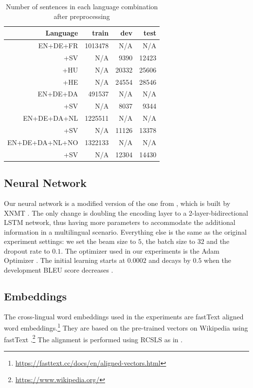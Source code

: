 \documentclass[thesis]{cluu}
\begin{document}
\begin{table}
  \centering
  \begin{tabular}{r|rrr}
    \hline
    \textbf{Language} & \textbf{train} & \textbf{dev} & \textbf{test} \\ [0.25ex]
    \hline\hline
    EN+DE+FR & 1013478 & N/A & N/A \\
    +SV & N/A & 9390 & 12423 \\
    +HU & N/A & 20332 & 25606 \\
    +HE & N/A & 24554 & 28546 \\
    \hline
    EN+DE+DA & 491537 & N/A & N/A \\
    +SV & N/A & 8037 & 9344 \\
    \hline
    EN+DE+DA+NL & 1225511 & N/A & N/A \\
    +SV & N/A & 11126 & 13378 \\
    \hline
    EN+DE+DA+NL+NO & 1322133 & N/A & N/A \\
    +SV & N/A & 12304 & 14430 \\
    \hline
  \end{tabular}
  \caption{Number of sentences in each language combination after preprocessing}
  \label{table:preprocessing}
\end{table}

\subsection{Neural Network}

Our neural network is a modified version of the one from \textcite{Qi:2018aa}, which is built by XNMT \parencite{Neubig:2018aa}. The only change is doubling the encoding layer to a 2-layer-bidirectional LSTM network, thus having more parameters to accommodate the additional information in a multilingual scenario. Everything else is the same as the original experiment settings: we set the beam size to $5$, the batch size to $32$ and the dropout rate to $0.1$. The optimizer used in our experiments is the Adam Optimizer \parencite{Kingma:2014aa}. The initial learning starts at $0.0002$ and decays by $0.5$ when the development BLEU score decreases \parencite{Denkowski:2017aa}.

\subsection{Embeddings}

The cross-lingual word embeddings used in the experiments are fastText aligned word embeddings.\footnote{\url{https://fasttext.cc/docs/en/aligned-vectors.html}} They are based on the pre-trained vectors on Wikipedia using fastText \parencite{Bojanowski:2016aa}.\footnote{\url{https://www.wikipedia.org/}} The alignment is performed using RCSLS as in \textcite{Joulin:2018aa}.
\end{document}

